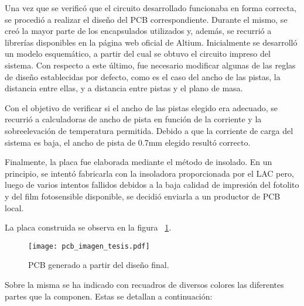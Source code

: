 Una vez que se verificó que el circuito desarrollado funcionaba en forma correcta, se procedió a realizar el diseño del PCB correspondiente. Durante el mismo, se creó la mayor parte de los encapsulados utilizados y, además, se recurrió a librerías disponibles en la página web oficial de Altium. Inicialmente se desarrolló un modelo esquemático, a partir del cual se obtuvo el circuito impreso del sistema. Con respecto a este último, fue necesario modificar algunas de las reglas de diseño establecidas por defecto, como es el caso del ancho de las pistas, la distancia entre ellas, y a distancia entre pistas y el plano de masa.

Con el objetivo de verificar si el ancho de las pistas elegido era adecuado, se recurrió a calculadoras de ancho de pista en función de la corriente y la sobreelevación de temperatura permitida. Debido a que la corriente de carga del sistema es baja, el ancho de pista de 0.7mm elegido resultó correcto.

Finalmente, la placa fue elaborada mediante el método de insolado. En un principio, se intentó fabricarla con la insoladora proporcionada por el LAC pero, luego de varios intentos fallidos debidos a la baja calidad de impresión del fotolito y del film fotosensible disponible, se decidió enviarla a un productor de PCB local. 

La placa construida se observa en la figura ~\ref{fig:img_pcb_imagen_tesis}.

\begin{figure}[H]
	\centering
	\texttt{[image: pcb\_imagen\_tesis.pdf]}
	\caption{PCB generado a partir del diseño final.}
	\label{fig:img_pcb_imagen_tesis}
\end{figure}

Sobre la misma se ha indicado con recuadros de diversos colores las diferentes partes que la componen. Estas se detallan a continuación:

